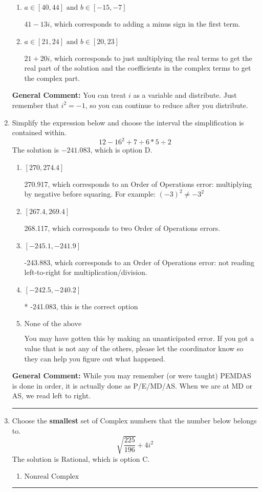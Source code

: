 \documentclass{extbook}[14pt]
\newcommand{\litem}[1]{\item #1

\rule{\textwidth}{0.4pt}}
\begin{document}
\begin{enumerate}
{\begin{enumerate}[label=\Alph*.]
 $41 + 13 i$, which corresponds to adding a minus sign in the second term.
\item \( a \in [40, 44] \text{ and } b \in [-15, -7] \)

 $41 - 13 i$, which corresponds to adding a minus sign in the first term.
\item \( a \in [21, 24] \text{ and } b \in [20, 23] \)

 $21 + 20 i$, which corresponds to just multiplying the real terms to get the real part of the solution and the coefficients in the complex terms to get the complex part.
\end{enumerate}

\textbf{General Comment:} You can treat $i$ as a variable and distribute. Just remember that $i^2=-1$, so you can continue to reduce after you distribute.
}
\litem{
Simplify the expression below and choose the interval the simplification is contained within.
\[ 12 - 16^2 + 7 \div 6 * 5 \div 2 \]The solution is \( -241.083 \), which is option D.\begin{enumerate}[label=\Alph*.]
\item \( [270, 274.4] \)

 270.917, which corresponds to an Order of Operations error: multiplying by negative before squaring. For example: $(-3)^2 \neq -3^2$
\item \( [267.4, 269.4] \)

 268.117, which corresponds to two Order of Operations errors.
\item \( [-245.1, -241.9] \)

 -243.883, which corresponds to an Order of Operations error: not reading left-to-right for multiplication/division.
\item \( [-242.5, -240.2] \)

* -241.083, this is the correct option
\item \( \text{None of the above} \)

 You may have gotten this by making an unanticipated error. If you got a value that is not any of the others, please let the coordinator know so they can help you figure out what happened.
\end{enumerate}

\textbf{General Comment:} While you may remember (or were taught) PEMDAS is done in order, it is actually done as P/E/MD/AS. When we are at MD or AS, we read left to right.
}
\litem{
Choose the \textbf{smallest} set of Complex numbers that the number below belongs to.
\[ \sqrt{\frac{225}{196}} + 4i^2 \]The solution is \( \text{Rational} \), which is option C.\begin{enumerate}[label=\Alph*.]
\item \( \text{Nonreal Complex} \)


\end{enumerate}}
\end{enumerate}
\end{document}
